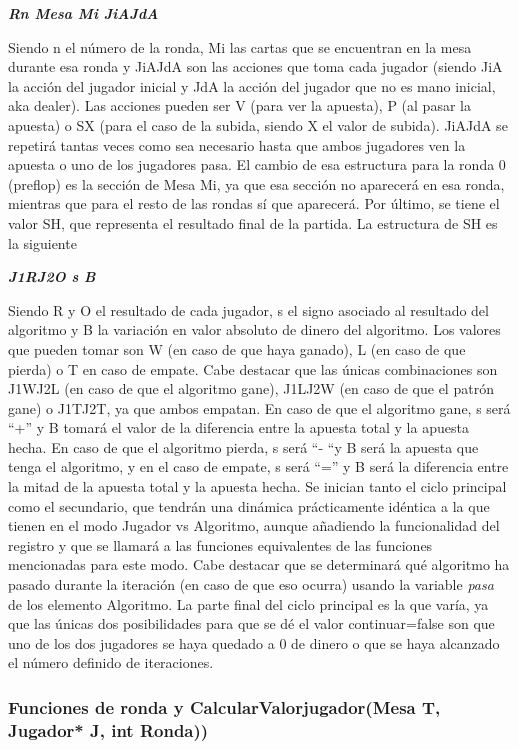 \begin{itemize}
\textit{\textbf{Rn Mesa Mi JiAJdA \/\/}}

Siendo n el número de la ronda, Mi las cartas que se encuentran en la mesa durante esa ronda y JiAJdA son las acciones que toma cada jugador (siendo JiA la acción del jugador inicial y JdA la acción del jugador que no es mano inicial, aka dealer). Las acciones pueden ser V (para ver la apuesta), P (al pasar la apuesta) o SX (para el caso de la subida, siendo X el valor de subida). JiAJdA se repetirá tantas veces como sea necesario hasta que ambos jugadores ven la apuesta o uno de los jugadores pasa.
El cambio de esa estructura para la ronda 0 (preflop) es la sección de Mesa Mi, ya que esa sección no aparecerá en esa ronda, mientras que para el resto de las rondas sí que aparecerá. 
Por último, se tiene el valor SH, que representa el resultado final de la partida. La estructura de SH es la siguiente

\textit{\textbf{J1RJ2O s B}}

Siendo R y O el resultado de cada jugador, s el signo asociado al resultado del algoritmo y B la variación en valor absoluto de dinero del algoritmo. Los valores que pueden tomar son W (en caso de que haya ganado), L (en caso de que pierda) o T en caso de empate. Cabe destacar que las únicas combinaciones son J1WJ2L (en caso de que el algoritmo gane), J1LJ2W (en caso de que el patrón gane) o J1TJ2T, ya que ambos empatan. En caso de que el algoritmo gane, s será “+” y B tomará el valor de la diferencia entre la apuesta total y la apuesta hecha. En caso de que el algoritmo pierda, s será “- “y B será la apuesta que tenga el algoritmo, y en el caso de empate, s será “=” y B será la diferencia entre la mitad de la apuesta total y la apuesta hecha.
Se inician tanto el ciclo principal como el secundario, que tendrán una dinámica prácticamente idéntica a la que tienen en el modo Jugador vs Algoritmo, aunque añadiendo la funcionalidad del registro y que se llamará a las funciones equivalentes de las funciones mencionadas para este modo. Cabe destacar que se determinará qué algoritmo ha pasado durante la iteración (en caso de que eso ocurra) usando la variable \textit{pasa} de los elemento Algoritmo.
La parte final del ciclo principal es la que varía, ya que las únicas dos posibilidades para que se dé el valor continuar=false son que uno de los dos jugadores se haya quedado a 0 de dinero o que se haya alcanzado el número definido de iteraciones.

\end{itemize}
\subsubsection{Funciones de ronda y CalcularValorjugador(Mesa T, Jugador* J, int Ronda))}

